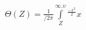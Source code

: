\documentclass[20pt]{report}
\begin{document}
\begin{center}
\(
\Theta (Z)=\frac{1}{/2\pi }\int\limits_{Z}^{\infty .\upsilon }^{\frac{-x^{2}}{2}}x
\)
\end{center}
\end{document}

